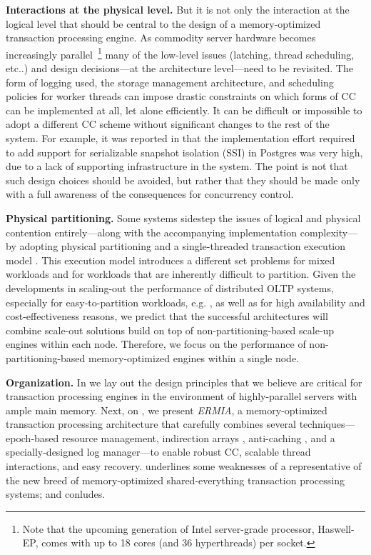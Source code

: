 \vspace{2mm}
{\bf Interactions at the physical level.} 
But it is not only the interaction at the logical level that should be central to the design of a memory-optimized transaction processing engine. As commodity server hardware becomes increasingly parallel~\footnote{Note that the upcoming generation of Intel server-grade processor, Haswell-EP, comes with up to 18 cores (and 36 hyperthreads) per socket.} many of the low-level issues (latching, thread scheduling, etc..) and design decisions---at the architecture level---need to be revisited. The form of logging used, the storage management architecture, and scheduling policies for worker threads can impose drastic constraints on which forms of CC can be implemented at all, let alone efficiently. 
It can be difficult or impossible to adopt a different CC scheme without significant changes to the rest of the system. 
For example, it was reported in \cite{PortsG12} that the implementation effort required to add support for serializable snapshot isolation (SSI) in Postgres was very high, due to a lack of supporting infrastructure in the system. 
The point is not that such design choices should be avoided, but rather that they should be made only with a full awareness of the consequences for concurrency control. 

\vspace{2mm}
{\bf Physical partitioning.} Some systems sidestep the issues of logical and physical contention entirely---along with the accompanying implementation complexity---by adopting physical partitioning and a single-threaded transaction execution model \cite{Kallman+08,KemperN11}. This execution model introduces a different set problems for mixed workloads and for workloads that are inherently difficult to partition.  Given the developments in scaling-out the performance of distributed OLTP systems, especially for easy-to-partition workloads, e.g. \cite{Corbett+12,BailisFHGS14,ThomsonA10}, as well as for high availability and cost-effectiveness reasons, we predict that the successful architectures will combine scale-out solutions build on top of non-partitioning-based scale-up engines within each node.
Therefore, we focus on the performance of non-partitioning-based memory-optimized engines within a single node.

\vspace{2mm}
{\bf Organization.} 
In  we lay out the design principles that we believe are critical for transaction processing engines in the environment of highly-parallel servers with ample main memory. Next, on , we present {\em ERMIA}, a memory-optimized transaction processing architecture that carefully combines several techniques---epoch-based resource management, indirection arrays \cite{SadoghiRCB13}, anti-caching \cite{DeBrabantPTSZ13}, and a specially-designed log manager---to enable robust CC, scalable thread interactions, and easy recovery.  
 underlines some weaknesses of a representative of the new breed of memory-optimized shared-everything transaction processing systems; and  conludes.



